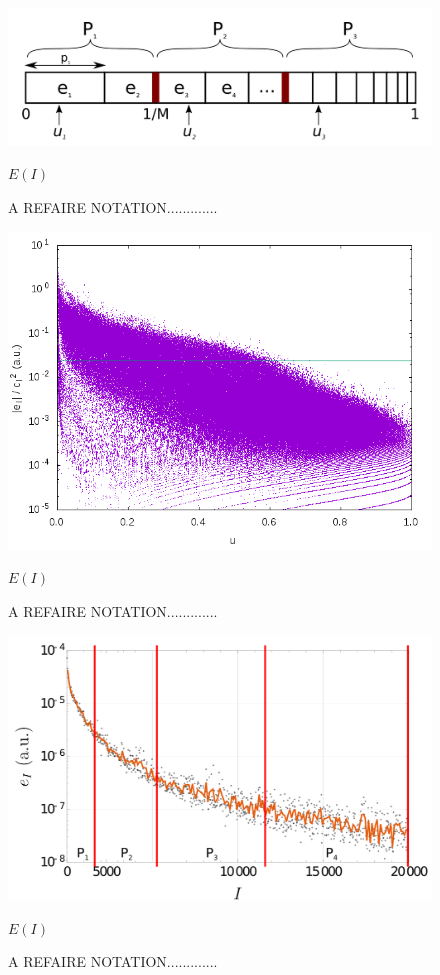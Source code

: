 \begin{figure}[h!]
	\begin{center}
		\includegraphics[width=0.9\columnwidth]{figures/pt2/comb}
		\caption{A REFAIRE NOTATION.............}
		\label{fig:comb}
		$E(I)$
	\end{center}
\end{figure}


\begin{figure}[h!]
	\begin{center}
		\includegraphics[width=0.9\columnwidth]{figures/pt2/eici2}
		\caption{A REFAIRE NOTATION.............}
		\label{fig:eici2}
		$E(I)$
	\end{center}
\end{figure}


\begin{figure}[h!]
	\begin{center}
		\includegraphics[width=0.9\columnwidth]{figures/pt2/P_i}
		\caption{A REFAIRE NOTATION.............}
		\label{fig:p_i}
		$E(I)$
	\end{center}
\end{figure}


